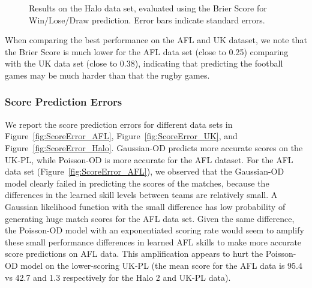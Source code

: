 \begin{center}
\begin{figure*}[t!]
 \centering
\caption{\small Results on the Halo data set, evaluated using the Brier Score for Win/Lose/Draw prediction. Error bars indicate
standard errors.}
\label{fig:WLAccuracy_Halo_BrierScore}
\end{figure*}
\end{center}

When comparing the best performance on the AFL and UK dataset, we note that the Brier Score is much lower for the AFL data set (close to 0.25) comparing with the UK data set (close to 0.38), indicating that predicting the football games may be much harder than that the rugby games. 


\subsubsection{Score Prediction Errors}


We report the score prediction errors for different data sets in Figure~\ref{fig:ScoreError_AFL}, Figure~\ref{fig:ScoreError_UK}, and Figure~\ref{fig:ScoreError_Halo}. Gaussian-OD predicts more accurate scores on the UK-PL, while Poisson-OD is more accurate for the AFL dataset. For the AFL data set (Figure~\ref{fig:ScoreError_AFL}), we observed that the Gaussian-OD model clearly failed in predicting the scores of the matches, because the differences in the learned skill levels between teams are relatively small. A Gaussian likelihood function with the small difference has low probability of generating huge match scores for the AFL data set. Given the same difference, the Poisson-OD model with an exponentiated scoring rate would seem to amplify these small performance differences in learned AFL skills to make more accurate score predictions on AFL data.  This amplification appears to hurt the Poisson-OD model on the lower-scoring UK-PL (the mean score for the AFL data is 95.4 vs 42.7 and 1.3 respectively for the Halo 2 and UK-PL data).

